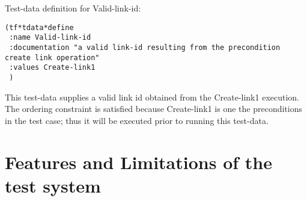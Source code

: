 \noindent Test-data definition for Valid-link-id:

\small\begin{verbatim}
(tf*tdata*define
 :name Valid-link-id  
 :documentation "a valid link-id resulting from the precondition create link operation"
 :values Create-link1 
 )
\end{verbatim}\normalsize

This test-data supplies a valid link id obtained from the Create-link1
execution.  The ordering constraint is satisfied because
Create-link1 is one the preconditions in the test case; thus
it will be executed prior to running this test-data.  


\section {Features and Limitations of the test system}

